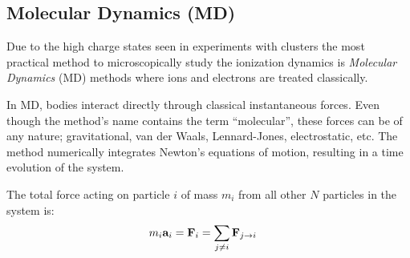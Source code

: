 
\subsection{Molecular Dynamics (MD)}
\label{section:tools:md}

Due to the high charge states seen in experiments with clusters the most
practical method to microscopically study the ionization dynamics is
\textit{Molecular Dynamics} (MD) methods where ions and electrons are treated
classically.

In MD, bodies interact directly through classical instantaneous forces. Even
though the method's name contains the term ``molecular'', these forces can be
of any nature; gravitational, van der Waals, Lennard-Jones, electrostatic, etc.
The method numerically integrates Newton's equations of motion, resulting in a
time evolution of the system.

The total force acting on particle $i$ of mass $m_i$ from all other $N$
particles in the system is:
\begin{align}
m_i \textbf{a}_i & = \textbf{F}_i = \sum_{j \ne i} \textbf{F}_{j \rightarrow i}
\label{eqn:md:newton}
\end{align}


